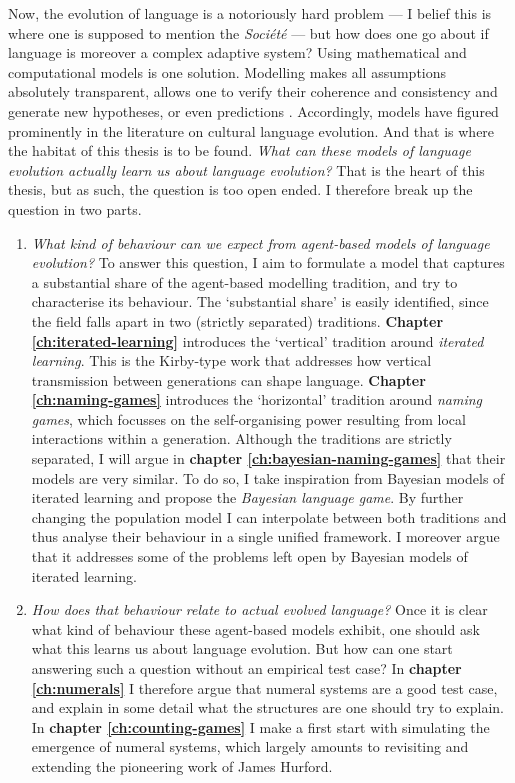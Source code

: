 \documentclass{../src/bcthesispart}
\begin{document}
\bigbreak\noindent
Now, the evolution of language is a notoriously hard problem — I belief this is where one is supposed to mention the \emph{Société} — but how does one go about if language is moreover a complex adaptive system?
Using mathematical and computational models is one solution.
Modelling makes all assumptions absolutely transparent, allows one to verify their coherence and consistency and generate new hypotheses, or even predictions \parencite{Jaeger2009}.
Accordingly, models have figured prominently in the literature on cultural language evolution.
And that is where the habitat of this thesis is to be found.
\emph{What can these models of language evolution actually learn us about language evolution?}
That is the heart of this thesis, but as such, the question is too open ended. 
I therefore break up the question in two parts.
\begin{enumerate}
	\item \emph{What kind of \emph{behaviour} can we expect from \emph{agent-based} models of language evolution?}
	To answer this question, I aim to formulate a model that captures a substantial share of the agent-based modelling tradition, and try to characterise its behaviour.
	The ‘substantial share’ is easily identified, since the field falls apart in two (strictly separated) traditions. 
	\textbf{Chapter \ref{ch:iterated-learning}} introduces the ‘vertical’ tradition around \emph{iterated learning}.
	This is the Kirby-type work that addresses how vertical transmission between generations can shape language. 
	\textbf{Chapter \ref{ch:naming-games}} introduces the ‘horizontal’ tradition around \emph{naming games}, which focusses on the self-organising power resulting from local interactions within a generation.
	Although the traditions are strictly separated, I will argue in \textbf{chapter \ref{ch:bayesian-naming-games}} that their models are very similar.
	To do so, I take inspiration from Bayesian models of iterated learning and propose the \emph{Bayesian language game}. 
	By further changing the population model I can interpolate between both traditions and thus analyse their behaviour in a single unified framework.
	I moreover argue that it addresses some of the problems left open by Bayesian models of iterated learning.
	
	\item \emph{How does that behaviour relate to actual evolved language?}
	Once it is clear what kind of behaviour these agent-based models exhibit, one should ask what this learns us about language evolution.
	But how can one start answering such a question without an empirical test case?
	In \textbf{chapter \ref{ch:numerals}} I therefore argue that numeral systems are a good test case, and explain in some detail what the structures are one should try to explain.
	In \textbf{chapter \ref{ch:counting-games}} I make a first start with simulating the emergence of numeral systems, which largely amounts to revisiting and extending the pioneering work of James Hurford.
\end{enumerate}
\end{document}
